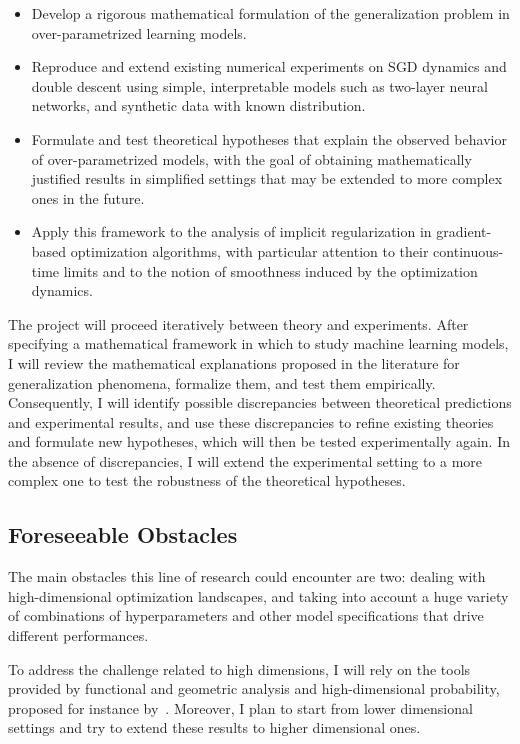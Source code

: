\documentclass[reqno]{amsart}
\begin{document}
\begin{itemize}
    \item Develop a rigorous mathematical formulation of the generalization problem in over-parametrized learning models.
    
    \item Reproduce and extend existing numerical experiments on SGD dynamics and double descent using simple, interpretable models such as two-layer neural networks, and synthetic data with known distribution.
    
    \item Formulate and test theoretical hypotheses that explain the observed behavior of over-parametrized models, with the goal of obtaining mathematically justified results in simplified settings that may be extended to more complex ones in the future.

    \item Apply this framework to the analysis of implicit regularization in gradient-based optimization algorithms, with particular attention to their continuous-time limits and to the notion of smoothness induced by the optimization dynamics.
\end{itemize}

The project will proceed iteratively between theory and experiments. 
After specifying a mathematical framework in which to study machine learning models, I will review the mathematical explanations proposed in the literature for generalization phenomena, formalize them, and test them empirically. Consequently, I will identify possible discrepancies between theoretical predictions and experimental results, and use these discrepancies to refine existing theories and formulate new hypotheses, which will then be tested experimentally again. In the absence of discrepancies, I will extend the experimental setting to a more complex one to test the robustness of the theoretical hypotheses.

\subsection{Foreseeable Obstacles}

The main obstacles this line of research could encounter are two: dealing with high-dimensional optimization landscapes, and taking into account a huge variety of combinations of hyperparameters and other model specifications that drive different performances. 

To address the challenge related to high dimensions, I will rely on the tools provided by functional and geometric analysis and high-dimensional probability, proposed for instance by~\cite{bandeira}. Moreover, I plan to start from lower dimensional settings and try to extend these results to higher dimensional ones. 
\end{document}
